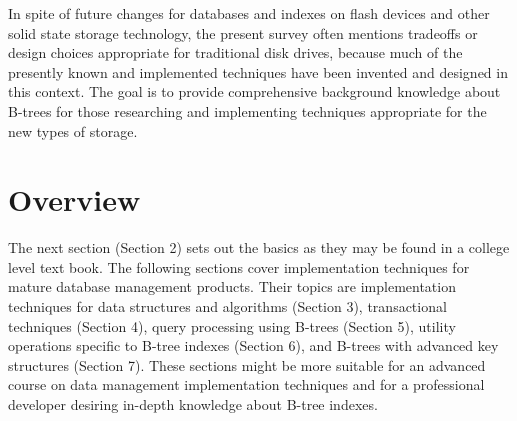 In spite of future changes for databases and indexes on flash devices
and other solid state storage technology, the present survey often
mentions tradeoffs or design choices appropriate for traditional disk
drives, because much of the presently known and implemented techniques
have been invented and designed in this context. The goal is to provide
comprehensive background knowledge about B-trees for those researching
and implementing techniques appropriate for the new types of storage.

\hypertarget{overview}{%
\section{Overview}\label{overview}}

The next section (Section 2) sets out the basics as they may be found in
a college level text book. The following sections cover implementation
techniques for mature database management products. Their topics are
implementation techniques for data structures and algorithms (Section
3), transactional techniques (Section 4), query processing using B-trees
(Section 5), utility operations specific to B-tree indexes (Section 6),
and B-trees with advanced key structures (Section 7). These sections
might be more suitable for an advanced course on data management
implementation techniques and for a professional developer desiring
in-depth knowledge about B-tree indexes.
